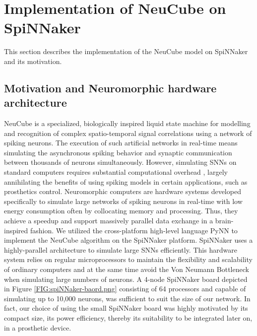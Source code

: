 \documentclass[journal,article,submit,moreauthors,pdftex,10pt,a4paper]{Definitions/mdpi}
\begin{document}
\section{Implementation of NeuCube on SpiNNaker}
This section describes the implementation of the NeuCube model on SpiNNaker and its motivation.

\subsection{Motivation and Neuromorphic hardware architecture}
NeuCube is a specialized, biologically inspired liquid state machine for modelling and recognition of complex spatio-temporal signal correlations using a network of spiking neurons. The execution of such artificial networks in real-time means simulating the asynchronous spiking behavior and synaptic communication between thousands of neurons simultaneously. However, simulating SNNs on standard computers requires substantial  computational overhead \cite{41}, largely annihilating the benefits of using spiking models in certain applications, such as prosthetics control. Neuromorphic computers are hardware systems \cite{41} developed specifically to simulate large networks of spiking neurons in real-time with low energy consumption often by collocating memory and processing. Thus, they achieve a speedup and support massively parallel data exchange in a brain-inspired fashion. 
We utilized the cross-platform high-level language PyNN\cite{42} to implement the NeuCube algorithm on the SpiNNaker platform. SpiNNaker \cite{7} uses a highly-parallel architecture to simulate large SNNs efficiently. This hardware system relies on regular microprocessors to maintain the flexibility and scalability of ordinary computers and at the  same time avoid the Von Neumann Bottleneck when simulating large numbers of neurons. A 4-node
SpiNNaker board depicted in Figure \ref{FIG:spiNNaker-baord.png} consisting of 64 processors and capable of simulating up to 10,000 neurons, was sufficient to suit the size of our network. In fact, our choice of using the small SpiNNaker board was highly motivated by its compact size, its power efficiency, thereby its suitability to be integrated later on, in a prosthetic device. 

\end{document}
